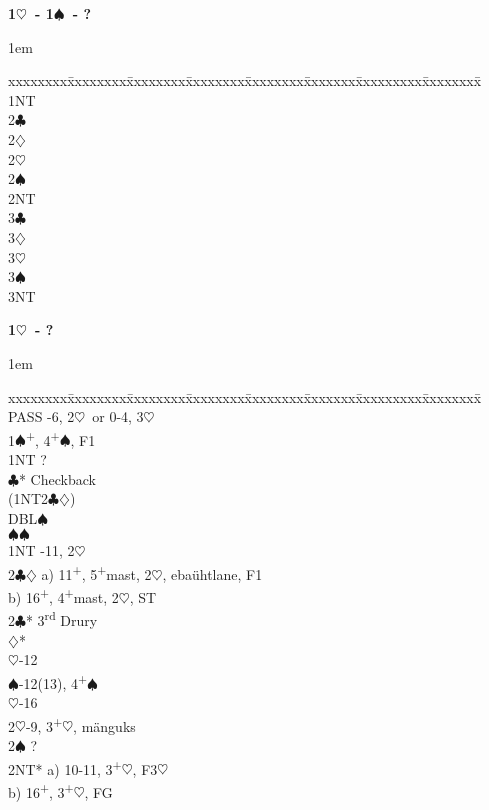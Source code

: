 \documentclass[10pt]{article}
\renewcommand{\c}{$\clubsuit$}
\renewcommand{\d}{$\diamondsuit$}
\newcommand{\h}{$\heartsuit$}
\newcommand{\s}{$\spadesuit$}
\newcommand{\p}{\textsuperscript{+}}
\newcommand{\m}{\textsuperscript{\textminus}}
\newcommand{\x}{DBL}
\newcommand{\rdh}{3\textsuperscript{rd}}
\newenvironment{bidtable}[1][]
{\textbf{#1}
  \begin{adjustwidth}{1em}{}
    \addvspace{2pt}
    \begin{tabbing}
      xxxxxxxx\=xxxxxxxx\=xxxxxxxx\=xxxxxxxx\=xxxxxxxx\=xxxxxxx\=xxxxxxxxx\=xxxxxxxx\=\kill}
{\end{tabbing}\end{adjustwidth}\bigskip}%
\begin{document}
\begin{bidtable}[1\h\ - 1\s\ - ?]
1NT \>  \\
2\c \>  \\
2\d \>  \\
2\h \>  \\
2\s \>  \\
2NT \>  \\
3\c \>  \\
3\d \>  \\
3\h \>  \\
3\s \>  \\
3NT \>  \\
\end{bidtable}
\begin{bidtable}[1\h\ - ?]
PASS       -6, 2\m\h\ or 0-4, 3\h                    \\
1\s        {}\p, 4\p\s , F1                             \\
           \> 1NT        \> ?                             \\
           \>            \c* \> Checkback             \\
           \> (1NT2\c\d) \>                               \\
           \>            \> \x   {}\s                   \\
           \>            \s  {}\s                   \\
1NT        -11, 2\m\h                                 \\
2\c\d      \> a) 11\p, 5\p mast, 2\m\h, ebaühtlane, F1    \\
           \> b) 16\p, 4\p mast, 2\m\h, ST                \\
2\c* \rdh  \> Drury                                       \\
           \d*       {}\m                           \\
           \h        {}-12                         \\
           \s        {}-12(13), 4\p\s               \\
           \h        {}-16                         \\
2\h        {}-9, 3\p\h, mänguks                         \\
2\s        \> ?                                           \\
2NT*       \> a) 10-11, 3\p\h, F3\h                       \\
           \> b) 16\p, 3\p\h, FG                          \\

\end{bidtable}
\end{document}

